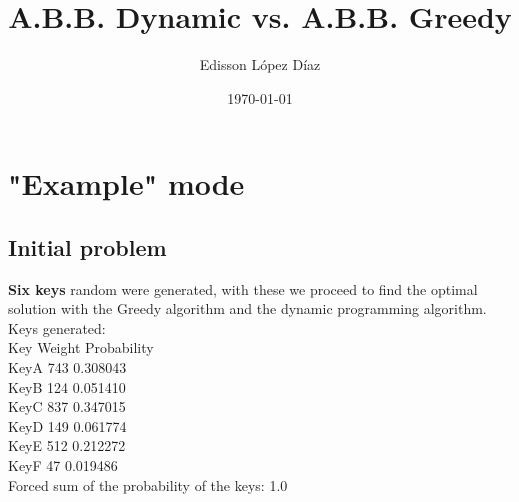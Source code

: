 \documentclass[a4paper,twocolumn,10pt]{article}
\title{A.B.B. Dynamic vs. A.B.B. Greedy}
\author{Edisson López Díaz}
\date{\today}
\newcommand\tab[1][1cm]{\hspace*{#1}}
\newcommand\minitab[1][0.5cm]{\hspace*{#1}}
\begin{document}
 
\maketitle 

\section{"Example" mode} 
\subsection*{Initial problem} 
\textbf{Six keys} random were generated, with these we proceed to find the optimal solution with the Greedy algorithm and the dynamic programming algorithm.\\ 
Keys generated: \\ 
\tab Key \minitab Weight \minitab Probability \\ 
\tab KeyA \minitab  743 \tab 0.308043 \\ 
 \tab KeyB \minitab  124 \tab 0.051410 \\ 
 \tab KeyC \minitab  837 \tab 0.347015 \\ 
 \tab KeyD \minitab  149 \tab 0.061774 \\ 
 \tab KeyE \minitab  512 \tab 0.212272 \\ 
 \tab KeyF \minitab  47 \tab 0.019486 \\ 
 
Forced sum of the probability of the keys: 1.0 \\ 
\end{document}
